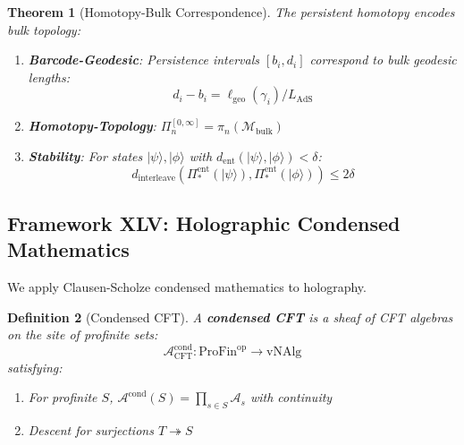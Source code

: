 \documentclass[12pt,a4paper]{article}
\newtheorem{theorem}{Theorem}[section]
\newtheorem{definition}[theorem]{Definition}
\begin{document}
\begin{theorem}[Homotopy-Bulk Correspondence]\label{thm:homotopy-bulk}
The persistent homotopy encodes bulk topology:
\begin{enumerate}
    \item \textbf{Barcode-Geodesic}: Persistence intervals $[b_i, d_i]$ correspond to bulk geodesic lengths:
    \begin{equation}
    d_i - b_i = \ell_{\text{geo}}(\gamma_i) / L_{\text{AdS}}
    \end{equation}
    
    \item \textbf{Homotopy-Topology}: $\Pi_n^{[0,\infty]} = \pi_n(\mathcal{M}_{\text{bulk}})$
    
    \item \textbf{Stability}: For states $|\psi\rangle, |\phi\rangle$ with $d_{\text{ent}}(|\psi\rangle, |\phi\rangle) < \delta$:
    \begin{equation}
    d_{\text{interleave}}(\Pi_*^{\text{ent}}(|\psi\rangle), \Pi_*^{\text{ent}}(|\phi\rangle)) \leq 2\delta
    \end{equation}
\end{enumerate}
\end{theorem}

\subsection{Framework XLV: Holographic Condensed Mathematics}

We apply Clausen-Scholze condensed mathematics to holography.

\begin{definition}[Condensed CFT]\label{def:condensed-cft}
A \textbf{condensed CFT} is a sheaf of CFT algebras on the site of profinite sets:
\begin{equation}
\mathcal{A}_{\text{CFT}}^{\text{cond}}: \text{ProFin}^{\text{op}} \to \text{vNAlg}
\end{equation}
satisfying:
\begin{enumerate}
    \item For profinite $S$, $\mathcal{A}^{\text{cond}}(S) = \prod_{s \in S} \mathcal{A}_s$ with continuity
    \item Descent for surjections $T \twoheadrightarrow S$
\end{enumerate}
\end{definition}
\end{document}
